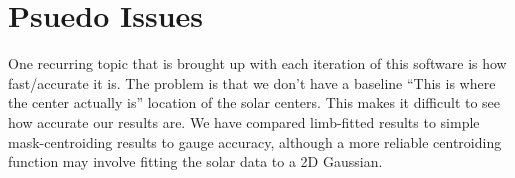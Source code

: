 \documentclass[10pt]{scrartcl}
\begin{document}

\section{Psuedo Issues} %
\label{sec:psuedo_issues}

One recurring topic that is brought up with each iteration of this software is how fast/accurate it is. The problem is that we don't have a baseline ``This is where the center actually is'' location of the solar centers. This makes it difficult to see how accurate our results are. We have compared limb-fitted results to simple mask-centroiding results to gauge accuracy, although a more reliable centroiding function may involve fitting the solar data to a 2D Gaussian. 
\end{document}
